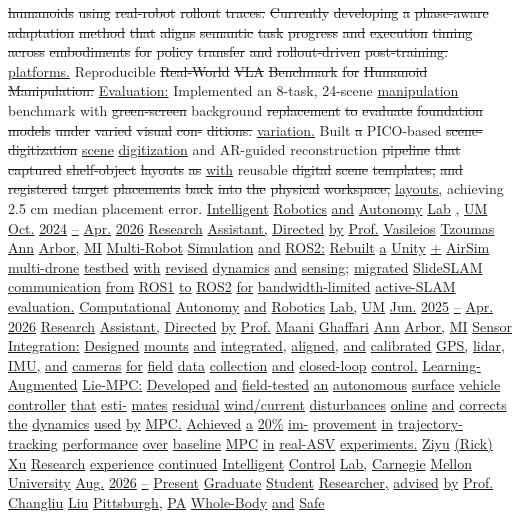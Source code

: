 \documentclass[10pt,letterpaper]{article}
\newcommand{\del}[1]{{\color{red}\sout{#1}}}
\newcommand{\add}[1]{{\color{blue}\uline{#1}}}
\begin{document}
\del{humanoids} \del{using} \del{real-robot} \del{rollout} \del{traces.} \del{Currently} \del{developing} \del{a} \del{phase-aware} \del{adaptation} \del{method} \del{that} \del{aligns} \del{semantic} \del{task} \del{progress} \del{and} \del{execution} \del{timing} \del{across} \del{embodiments} \del{for} \del{policy} \del{transfer} \del{and} \del{rollout-driven} \del{post-training.} \add{platforms.}  Reproducible \del{Real-World} \del{VLA} \del{Benchmark} \del{for} \del{Humanoid} \del{Manipulation:} \add{Evaluation:} Implemented an 8-task, 24-scene \add{manipulation} benchmark with \del{green-screen} background \del{replacement} \del{to} \del{evaluate} \del{foundation} \del{models} \del{under} \del{varied} \del{visual} \del{con-} \del{ditions.} \add{variation.} Built \del{a} PICO-based \del{scene-digitization} \add{scene} \add{digitization} and AR-guided reconstruction \del{pipeline} \del{that} \del{captured} \del{shelf-object} \del{layouts} \del{as} \add{with} reusable \del{digital} \del{scene} \del{templates,} \del{and} \del{registered} \del{target} \del{placements} \del{back} \del{into} \del{the} \del{physical} \del{workspace,} \add{layouts,} achieving 2.5 cm median placement error. \add{Intelligent} \add{Robotics} \add{and} \add{Autonomy} \add{Lab} \add{,} \add{UM} \add{Oct.} \add{2024} \add{--} \add{Apr.} \add{2026} \add{Research} \add{Assistant,} \add{Directed} \add{by} \add{Prof.} \add{Vasileios} \add{Tzoumas} \add{Ann} \add{Arbor,} \add{MI} \add{} \add{Multi-Robot} \add{Simulation} \add{and} \add{ROS2:} \add{Rebuilt} \add{a} \add{Unity} \add{+} \add{AirSim} \add{multi-drone} \add{testbed} \add{with} \add{revised} \add{dynamics} \add{and} \add{sensing;} \add{migrated} \add{SlideSLAM} \add{communication} \add{from} \add{ROS1} \add{to} \add{ROS2} \add{for} \add{bandwidth-limited} \add{active-SLAM} \add{evaluation.} \add{Computational} \add{Autonomy} \add{and} \add{Robotics} \add{Lab,} \add{UM} \add{Jun.} \add{2025} \add{--} \add{Apr.} \add{2026} \add{Research} \add{Assistant,} \add{Directed} \add{by} \add{Prof.} \add{Maani} \add{Ghaffari} \add{Ann} \add{Arbor,} \add{MI} \add{} \add{Sensor} \add{Integration:} \add{Designed} \add{mounts} \add{and} \add{integrated,} \add{aligned,} \add{and} \add{calibrated} \add{GPS,} \add{lidar,} \add{IMU,} \add{and} \add{cameras} \add{for} \add{field} \add{data} \add{collection} \add{and} \add{closed-loop} \add{control.} \add{} \add{Learning-Augmented} \add{Lie-MPC:} \add{Developed} \add{and} \add{field-tested} \add{an} \add{autonomous} \add{surface} \add{vehicle} \add{controller} \add{that} \add{esti-} \add{mates} \add{residual} \add{wind/current} \add{disturbances} \add{online} \add{and} \add{corrects} \add{the} \add{dynamics} \add{used} \add{by} \add{MPC.} \add{Achieved} \add{a} \add{20\%} \add{im-} \add{provement} \add{in} \add{trajectory-tracking} \add{performance} \add{over} \add{baseline} \add{MPC} \add{in} \add{real-ASV} \add{experiments.} \add{Ziyu} \add{(Rick)} \add{Xu} \add{Research} \add{experience} \add{continued} \add{Intelligent} \add{Control} \add{Lab,} \add{Carnegie} \add{Mellon} \add{University} \add{Aug.} \add{2026} \add{--} \add{Present} \add{Graduate} \add{Student} \add{Researcher,} \add{advised} \add{by} \add{Prof.} \add{Changliu} \add{Liu} \add{Pittsburgh,} \add{PA} \add{} \add{Whole-Body} \add{and} \add{Safe} 
\end{document}
